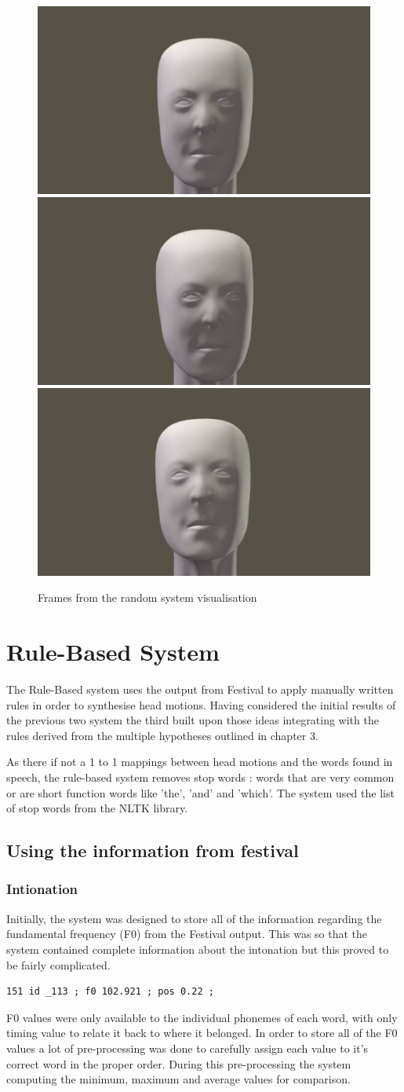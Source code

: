 \documentclass[bsc,frontabs,twoside,singlespacing,parskip]{infthesis}
\begin{document}
\begin{figure}
	\centering
	\includegraphics[width=.3\textwidth]{fightclub1.png}
	\includegraphics[width=.3\textwidth]{fightclub3.png}
	\includegraphics[width=.3\textwidth]{fightclub4.png}
	\caption{Frames from the random system visualisation}
\end{figure}

\section{Rule-Based System}

The Rule-Based system uses the output from Festival to apply manually written rules in order to synthesise head motions. Having considered the initial results of the previous two system the third built upon those ideas integrating with the rules derived from the multiple hypotheses outlined in chapter 3.

As there if not a 1 to 1 mappings between head motions and the words found in speech, the rule-based system removes stop words : words that are very common or are short function words like 'the', 'and' and 'which'. The system used the list of stop words from the NLTK library.

\subsection{Using the information from festival}
\subsubsection{Intionation}

Initially, the system was designed to store all of the information regarding the fundamental frequency (F0) from the Festival output. This was so that the system contained complete information about the intonation but this proved to be fairly complicated.
\begin{lstlisting}
151 id _113 ; f0 102.921 ; pos 0.22 ; 
\end{lstlisting}
F0 values were only available to the individual phonemes of each word, with only timing value to relate it back to where it belonged. In order to store all of the F0 values a lot of pre-processing was done to carefully assign each value to it's correct word in the proper order. During this pre-processing the system computing the minimum, maximum and average values for comparison.
\end{document}
